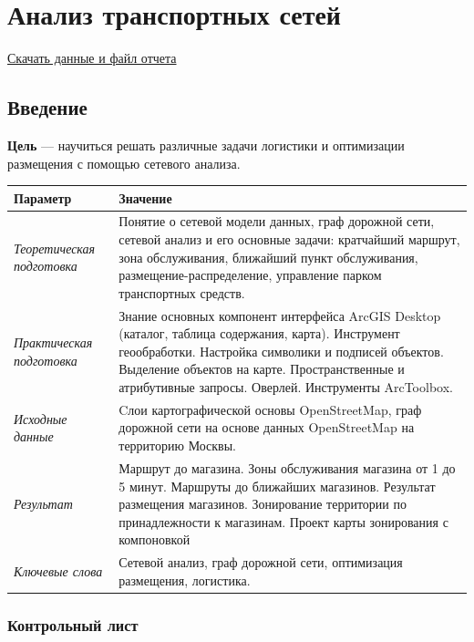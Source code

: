 \documentclass[]{book}
\theoremstyle{definition}
\theoremstyle{definition}
\theoremstyle{definition}
\theoremstyle{remark}
\begin{document}
\hypertarget{network-analysis}{%
\chapter{Анализ транспортных сетей}\label{network-analysis}}

\href{http://autolab.geogr.msu.ru/gis/data/Ex12.zip}{Скачать данные и
файл отчета}

\hypertarget{network-analysis-intro}{%
\section{Введение}\label{network-analysis-intro}}

\textbf{Цель} --- научиться решать различные задачи логистики и
оптимизации размещения с помощью сетевого анализа.

\begin{longtable}[]{@{}ll@{}}
\toprule
Параметр & Значение\tabularnewline
\midrule
\endhead
\emph{Теоретическая подготовка} & Понятие о сетевой модели данных, граф
дорожной сети, сетевой анализ и его основные задачи: кратчайший маршрут,
зона обслуживания, ближайший пункт обслуживания,
размещение-распределение, управление парком транспортных
средств.\tabularnewline
\emph{Практическая подготовка} & Знание основных компонент интерфейса
ArcGIS Desktop (каталог, таблица содержания, карта). Инструмент
геообработки. Настройка символики и подписей объектов. Выделение
объектов на карте. Пространственные и атрибутивные запросы. Оверлей.
Инструменты ArcToolbox.\tabularnewline
\emph{Исходные данные} & Cлои картографической основы OpenStreetMap,
граф дорожной сети на основе данных OpenStreetMap на территорию
Москвы.\tabularnewline
\emph{Результат} & Маршрут до магазина. Зоны обслуживания магазина от 1
до 5 минут. Маршруты до ближайших магазинов. Результат размещения
магазинов. Зонирование территории по принадлежности к магазинам. Проект
карты зонирования с компоновкой\tabularnewline
\emph{Ключевые слова} & Сетевой анализ, граф дорожной сети, оптимизация
размещения, логистика.\tabularnewline
\bottomrule
\end{longtable}

\hypertarget{network-analysis-control}{%
\subsection{Контрольный лист}\label{network-analysis-control}}
\end{document}
